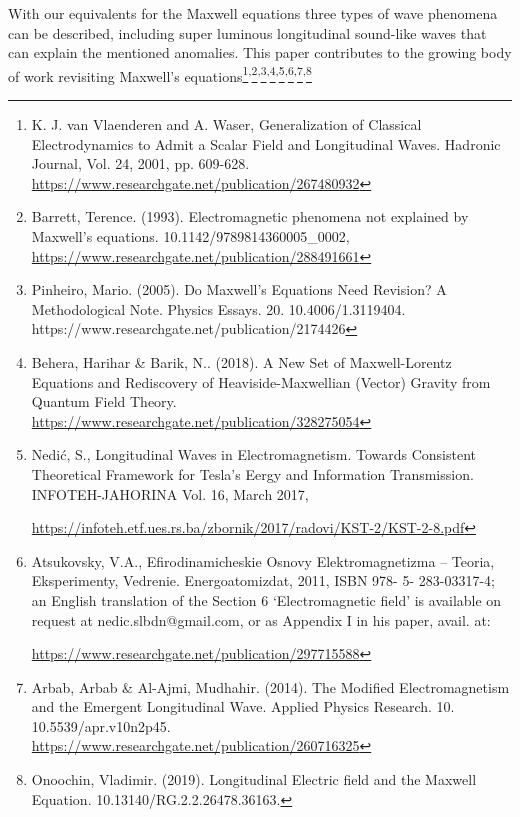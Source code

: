 \documentclass[a4paper]{article}
\newcommand\textstyleInternetlink[1]{#1}
\begin{document}
{
{With our equivalents for the Maxwell equations three types of wave
phenomena can be described, including super luminous longitudinal sound-like waves that can explain the  mentioned
anomalies. This paper contributes to the growing body of work revisiting Maxwell's equations}\footnote{ K. J. van
Vlaenderen and A. Waser, Generalization of Classical Electrodynamics to Admit a Scalar Field and Longitudinal Waves.
Hadronic Journal, Vol. 24, 2001, pp. 609-628. \url{https://www.researchgate.net/publication/267480932} \par
}{\textsuperscript{,}}\footnote{ Barrett, Terence. (1993).
Electromagnetic phenomena not explained by Maxwell's equations. 10.1142/9789814360005\_0002, 
\url{https://www.researchgate.net/publication/288491661} \par
}{\textsuperscript{,}}\footnote{ Pinheiro, Mario. (2005). Do
Maxwell's Equations Need Revision? A Methodological Note. Physics Essays. 20. 10.4006/1.3119404. 
\textstyleInternetlink{https://www.researchgate.net/publication/2174426} \par
}{\textsuperscript{,}}\footnote{ Behera, Harihar \& Barik, N..
(2018). A New Set of Maxwell-Lorentz Equations and Rediscovery of Heaviside-Maxwellian (Vector) Gravity from Quantum
Field Theory. \url{https://www.researchgate.net/publication/328275054}\textstyleInternetlink{ }\par
}{\textsuperscript{,}}\footnote{ Nedi\'{c}, S., Longitudinal Waves
in Electromagnetism. Towards Consistent Theoretical Framework for Tesla's Eergy and Information Transmission.
INFOTEH-JAHORINA Vol. 16, March 2017, \par \url{https://infoteh.etf.ues.rs.ba/zbornik/2017/radovi/KST-2/KST-2-8.pdf}
}{\textsuperscript{,}}\footnote{ Atsukovsky, V.A.,
Efirodinamicheskie Osnovy Elektromagnetizma -- Teoria, Eksperimenty, Vedrenie. Energoatomizdat, 2011, ISBN 978- 5-
283-03317-4; an English translation of the Section 6 `Electromagnetic field' is available on request at
nedic.slbdn@gmail.com, or as Appendix I in his paper, avail. at: \par
\url{https://www.researchgate.net/publication/297715588} \par
}{\textsuperscript{,}}\footnote{ Arbab, Arbab \& Al-Ajmi, Mudhahir.
(2014). The Modified Electromagnetism and the Emergent Longitudinal Wave. Applied Physics Research. 10.
10.5539/apr.v10n2p45. \url{https://www.researchgate.net/publication/260716325} \par
}{\textsuperscript{,}}\footnote{ Onoochin, Vladimir. (2019).
Longitudinal Electric field and the Maxwell Equation. 10.13140/RG.2.2.26478.36163. 
}}
\end{document}
